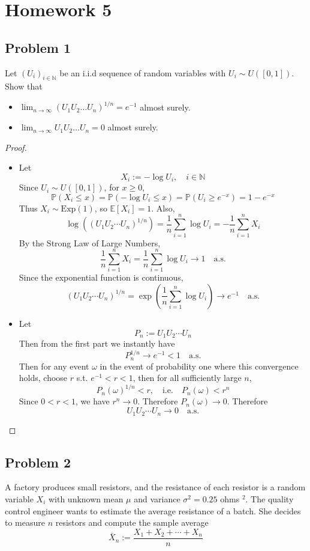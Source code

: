 \chapter*{Homework 5}
\section*{Problem 1}
Let $\left(U_i\right)_{i \in \mathbb{N}}$ be an i.i.d sequence 
of random variables with $U_i \sim U([0,1])$. Show that
\begin{itemize}
\item $\lim _{n \rightarrow \infty}\left(U_1 U_2 \ldots U_n\right)^{1 / n}=e^{-1}$ almost surely.
\item $\lim _{n \rightarrow \infty} U_1 U_2 \ldots U_n=0$ almost surely.
\end{itemize}
\begin{proof}
\begin{itemize}
\item
Let
\[
X_i := -\log U_i, \quad i \in \mathbb{N}
\]
Since \(U_i \sim U([0,1])\), for \(x \ge 0\),
\[
\mathbb{P}(X_i \le x)
= \mathbb{P}(-\log U_i \le x)
= \mathbb{P}(U_i \ge e^{-x})
= 1 - e^{-x}
\]
Thus \(X_i \sim \mathrm{Exp}(1)\), so
\(
\mathbb{E}[X_i] = 1
\). 
Also,
\[
\log\left((U_1U_2\cdots U_n)^{1/n}\right)
= \frac{1}{n}\sum_{i=1}^n \log U_i
= -\frac{1}{n}\sum_{i=1}^n X_i
\]
By the Strong Law of Large Numbers,
\[
\frac{1}{n}\sum_{i=1}^n X_i = \frac{1}{n}\sum_{i=1}^n \log U_i\to 1
\quad \text{a.s.}
\]
Since the exponential function is continuous,
\[
(U_1U_2\cdots U_n)^{1/n}
= \exp\left(\frac{1}{n}\sum_{i=1}^n \log U_i\right)
\to e^{-1}
\quad \text{a.s.}
\]

\item
Let
\[
P_n := U_1U_2\cdots U_n
\]
Then from the first part we instantly have
\[
P_n^{1/n} \to e^{-1} < 1
\quad \text{a.s.}
\]
Then for any event \(\omega\) in the event of probability one where this convergence holds,
choose \(r\) s.t. 
\(
e^{-1} < r < 1
\), 
then for all sufficiently large \(n\),
\[
P_n(\omega)^{1/n} < r,\quad \text{i.e.} \quad P_n(\omega) < r^n
\]
Since \(0<r<1\), we have \(r^n \to 0\). Therefore
\(
P_n(\omega) \to 0
\). Therefore 
\[
U_1U_2\cdots U_n \to 0
\quad \text{a.s.}
\]
\end{itemize}
\end{proof}



\section*{Problem 2}
A factory produces small resistors, and the resistance of each resistor 
is a random variable $X_i$ with unknown mean $\mu$ and variance $\sigma^2=0.25$ ohms $^2$.
The quality control engineer wants to estimate the average resistance of a batch. 
She decides to measure $n$ resistors and compute the sample average
$$
\bar{X}_n:=\frac{X_1+X_2+\cdots+X_n}{n}
$$

